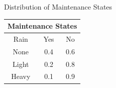 \documentclass{beamer}
\begin{document}
\begin{frame}{Distribution of Maintenance States}
\begin{center}
    \begin{tabular}{|c|c|c|}
         \hline
         \multicolumn{3}{|c|}{Maintenance States}\\
         \hline
         Rain & Yes  & No  \\
         \hline
         None & 0.4  & 0.6  \\
         \hline
         Light & 0.2  & 0.8  \\
         \hline
         Heavy & 0.1  & 0.9  \\
         \hline
    \end{tabular}
\end{center}    
\end{frame}
\end{document}
